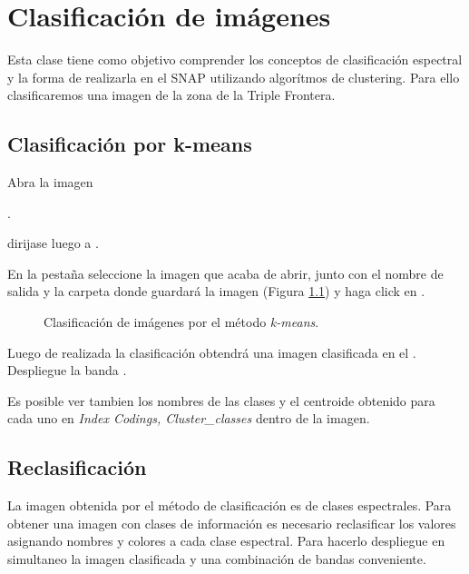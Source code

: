 \chapter{Clasificación de imágenes}

Esta clase tiene como objetivo comprender los conceptos de clasificación espectral y la forma de realizarla en el SNAP utilizando algorítmos de clustering. Para ello clasificaremos una imagen de la zona de la Triple Frontera.

\section{Clasificación por k-means}

Abra la imagen

\begin{center}
.
\end{center}

dirijase luego a .

En la pestaña  seleccione la imagen que acaba de abrir, junto con el nombre de salida y la carpeta donde guardará la imagen (Figura \ref{fig:kmeans}) y haga click en .

\begin{figure}[h!]
    \centering
    \hspace{1cm}
    \caption{Clasificación de imágenes por el método \emph{k-means}.}
    \label{fig:kmeans}
\end{figure}

Luego de realizada la clasificación obtendrá una imagen clasificada en el . Despliegue la banda .

Es posible ver tambien los nombres de las clases y el centroide obtenido para cada uno en \emph{Index Codings, Cluster\_classes} dentro de la imagen.

\section{Reclasificación}

La imagen obtenida por el método de clasificación es de clases espectrales. Para obtener una imagen con clases de información es necesario reclasificar los valores asignando nombres y colores a cada clase espectral. Para hacerlo despliegue en simultaneo la imagen clasificada y una combinación de bandas conveniente.

